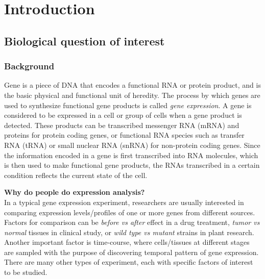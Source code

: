 \section{Introduction}\label{sec:intro}

\subsection{Biological question of interest}\label{subsec:biol}

\subsubsection{Background}

Gene is a piece of DNA that encodes a functional RNA or protein product, and is the basic physical
and functional unit of heredity. The process by which genes are used to synthesize functional gene
products is called \textit{gene expression}.  A gene is considered to be expressed in a cell or
group of cells when a gene product is detected.
These products can be transcribed messenger RNA (mRNA) and proteins for protein coding genes, or
functional RNA species such as transfer RNA (tRNA) or small nuclear RNA (snRNA) for non-protein
coding genes.
Since the information encoded in a gene is first transcribed into RNA molecules, which is then used
to make functional gene products, the RNAs transcribed
in a certain condition reflects the current state of the cell.







\textbf{Why do people do expression analysis?}\\
In a typical gene expression experiment, researchers are usually interested in comparing expression
levels/profiles of one or more genes from different sources. Factors for comparison can be
\textit{before vs
	after} effect in a drug treatment, \textit{tumor vs normal} tissues in clinical study, or
\textit{wild type vs mutant} strains in plant research. Another important factor is time-course,
where cells/tissues at different stages are sampled with the purpose of discovering temporal pattern
of gene expression. There are many other types of experiment, each with specific factors of interest
to be studied.


